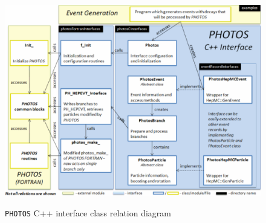 \documentclass[]{Photos_interface_design}
\begin{document}
\begin{figure}[h!]
\centering
\includegraphics[scale=0.6]{interface_design.eps}
\label{fig:design}
\caption{{\tt PHOTOS} C++ interface class relation diagram}
\end{figure}
\end{document}
